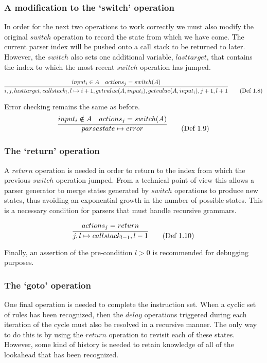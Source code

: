 \documentclass[envcountsame,runningheads]{llncs}
\begin{document}
\subsubsection{A modification to the `switch' operation}
In order for the next two operations to work correctly we must also modify the original $switch$ operation to record the state from which we have come.
The current parser index will be pushed onto a call stack to be returned to later. 
However, the $switch$ also sets one additional variable, $lasttarget$, that contains the index to which the most recent $switch$ operation has jumped.

\begin{equation}
\infer{i, j, lasttarget, callstack_l, l \mapsto i+1, getvalue(A, input_i), getvalue(A, input_i), j+1, l+1}{input_i \in A & actions_j = switch(A)} \tag{Def 1.8}
\end{equation}

Error checking remains the same as before.
\begin{equation}
\infer{parsestate \mapsto error}{input_i \notin A & actions_j = switch(A)} \tag{Def 1.9}
\end{equation}

\subsubsection{The `return' operation}
A $return$ operation is needed in order to return to the index from which the previous $switch$ operation jumped. 
From a technical point of view this allows a parser generator to merge states generated by $switch$ operations to produce new states, thus avoiding an exponential growth in the number of possible states.
This is a necessary condition for parsers that must handle recursive grammars.

\begin{equation}
\infer{j, l \mapsto callstack_{l-1}, l-1}{actions_j = return} \tag{Def 1.10}
\end{equation}

Finally, an assertion of the pre-condition $l > 0$ is recommended for debugging purposes.

\subsubsection{The `goto' operation}
One final operation is needed to complete the instruction set.
When a cyclic set of rules has been recognized, then the $delay$ operations triggered during each iteration of the cycle must also be resolved in a recursive manner.
The only way to do this is by using the $return$ operation to revisit each of these states.
However, some kind of history is needed to retain knowledge of all of the lookahead that has been recognized.
\end{document}
